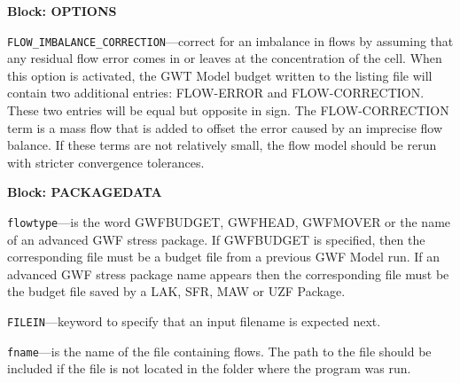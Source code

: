 
\item \textbf{Block: OPTIONS}

\begin{description}
\item \texttt{FLOW\_IMBALANCE\_CORRECTION}---correct for an imbalance in flows by assuming that any residual flow error comes in or leaves at the concentration of the cell.  When this option is activated, the GWT Model budget written to the listing file will contain two additional entries: FLOW-ERROR and FLOW-CORRECTION.  These two entries will be equal but opposite in sign.  The FLOW-CORRECTION term is a mass flow that is added to offset the error caused by an imprecise flow balance.  If these terms are not relatively small, the flow model should be rerun with stricter convergence tolerances.

\end{description}
\item \textbf{Block: PACKAGEDATA}

\begin{description}
\item \texttt{flowtype}---is the word GWFBUDGET, GWFHEAD, GWFMOVER or the name of an advanced GWF stress package.  If GWFBUDGET is specified, then the corresponding file must be a budget file from a previous GWF Model run.  If an advanced GWF stress package name appears then the corresponding file must be the budget file saved by a LAK, SFR, MAW or UZF Package.

\item \texttt{FILEIN}---keyword to specify that an input filename is expected next.

\item \texttt{fname}---is the name of the file containing flows.  The path to the file should be included if the file is not located in the folder where the program was run.

\end{description}


